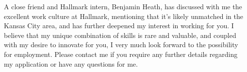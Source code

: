 \documentclass[11pt,a4paper,sans]{moderncv}        %
\begin{document}

A close friend and Hallmark intern, Benjamin Heath, has discussed with me the excellent work culture at Hallmark, mentioning that it's likely unmatched in the Kansas City area, and has further deepened my interest in working for you.
I believe that my unique combination of skills is rare and valuable, and coupled with my desire to innovate for you, I very much look forward to the possibility for employment.
Please contact me if you require any further details regarding my application or have any questions for me.

\makeletterclosing
\end{document}
